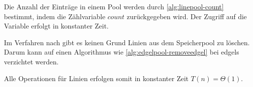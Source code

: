 

Die Anzahl der Einträge in einem Pool werden durch \autoref{alg:linepool-count} bestimmt, indem die Zählvariable
 $\mathit{count}$ zurückgegeben wird. Der Zugriff auf die Variable erfolgt in konstanter Zeit.



Im Verfahren nach \citeauthor{clarke96} gibt es keinen Grund Linien aus dem Speicherpool zu löschen. Darum kann auf
 einen Algorithmus wie \autoref{alg:edgelpool-removeedgel} bei \glspl{edgel} verzichtet werden.

Alle Operationen für Linien erfolgen somit in konstanter Zeit $T(n) = \Theta(1)$.

